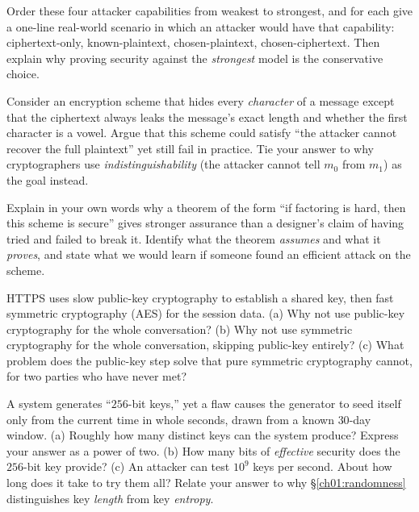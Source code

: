 \begin{exercise}
Order these four attacker capabilities from weakest to strongest, and for each give a one-line real-world scenario in which an attacker would have that capability: ciphertext-only, known-plaintext, chosen-plaintext, chosen-ciphertext. Then explain why proving security against the \emph{strongest} model is the conservative choice.
\end{exercise}

\begin{exercise}
Consider an encryption scheme that hides every \emph{character} of a message except that the ciphertext always leaks the message's exact length and whether the first character is a vowel. Argue that this scheme could satisfy ``the attacker cannot recover the full plaintext'' yet still fail in practice. Tie your answer to why cryptographers use \emph{indistinguishability} (the attacker cannot tell $m_0$ from $m_1$) as the goal instead.
\end{exercise}

\begin{exercise}
Explain in your own words why a theorem of the form ``if factoring is hard, then this scheme is secure'' gives stronger assurance than a designer's claim of having tried and failed to break it. Identify what the theorem \emph{assumes} and what it \emph{proves}, and state what we would learn if someone found an efficient attack on the scheme.
\end{exercise}

\begin{exercise}
HTTPS uses slow public-key cryptography to establish a shared key, then fast symmetric cryptography (AES) for the session data.
(a) Why not use public-key cryptography for the whole conversation?
(b) Why not use symmetric cryptography for the whole conversation, skipping public-key entirely?
(c) What problem does the public-key step solve that pure symmetric cryptography cannot, for two parties who have never met?
\end{exercise}

\begin{exercise}
A system generates ``$256$-bit keys,'' yet a flaw causes the generator to seed itself only from the current time in whole seconds, drawn from a known $30$-day window.
(a) Roughly how many distinct keys can the system produce? Express your answer as a power of two.
(b) How many bits of \emph{effective} security does the $256$-bit key provide?
(c) An attacker can test $10^{9}$ keys per second. About how long does it take to try them all? Relate your answer to why \S\ref{ch01:randomness} distinguishes key \emph{length} from key \emph{entropy}.
\end{exercise}

